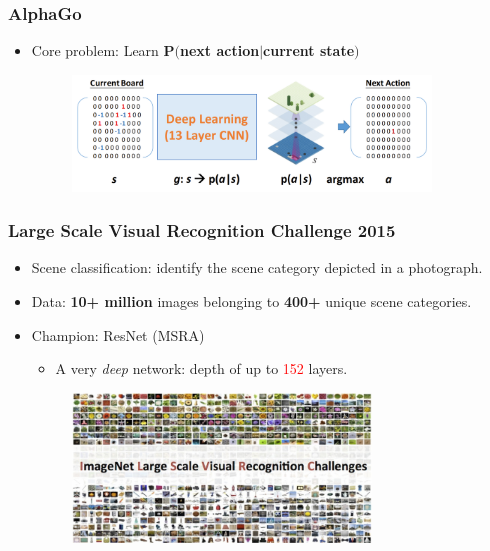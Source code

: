 \documentclass{beamer}
\newcommand{\tr}[1]{\textcolor{red}{#1}} %
\begin{document}
\begin{frame}
\frametitle{AlphaGo}
\begin{itemize}
\item Core problem: Learn $\mathbf{P(}$\textbf{next action}$ | $\textbf{current state}$\mathbf{)}$
\begin{figure}
      \includegraphics[width=0.9\textwidth]{figs/alphago5.png}
\end{figure}
\end{itemize}
\end{frame}

\begin{frame}
\frametitle{Large Scale Visual Recognition Challenge 2015}
\begin{itemize}
\item Scene classification: identify the scene category depicted in a photograph.
\item Data: \textbf{10+ million} images belonging to \textbf{400+} unique scene categories.
\item Champion: ResNet (MSRA)
\begin{itemize}
\item A very \textit{deep} network: depth of up to \tr{152} layers. 
\end{itemize}
\begin{figure}
      \includegraphics[width=0.75\textwidth]{figs/ca-ilsvrc.jpg}
\end{figure}
\end{itemize}
\end{frame}
\end{document}
